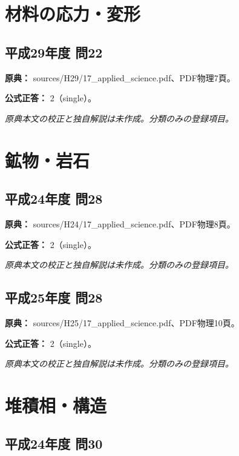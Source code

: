 \section{材料の応力・変形}

\subsection{平成29年度 問22}
\label{q:h29-reg-applied-22}

\noindent\textbf{原典：} sources/H29/17\_applied\_science.pdf、PDF物理7頁。

\textbf{公式正答：} 2（single）。

\par\textit{原典本文の校正と独自解説は未作成。分類のみの登録項目。}

\section{鉱物・岩石}

\subsection{平成24年度 問28}
\label{q:h24-reg-applied-28}

\noindent\textbf{原典：} sources/H24/17\_applied\_science.pdf、PDF物理8頁。

\textbf{公式正答：} 2（single）。

\par\textit{原典本文の校正と独自解説は未作成。分類のみの登録項目。}

\subsection{平成25年度 問28}
\label{q:h25-reg-applied-28}

\noindent\textbf{原典：} sources/H25/17\_applied\_science.pdf、PDF物理10頁。

\textbf{公式正答：} 2（single）。

\par\textit{原典本文の校正と独自解説は未作成。分類のみの登録項目。}

\section{堆積相・構造}

\subsection{平成24年度 問30}
\label{q:h24-reg-applied-30}

